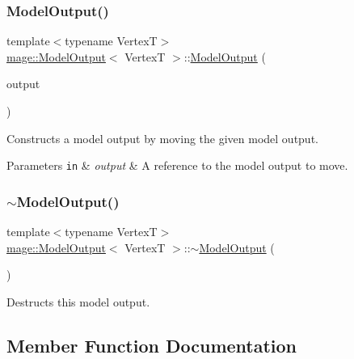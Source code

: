 \subsubsection{\texorpdfstring{Model\+Output()}{ModelOutput()}\hspace{0.1cm}{\footnotesize\ttfamily [3/3]}}
{\footnotesize\ttfamily template$<$typename VertexT$>$ \\
\hyperlink{structmage_1_1_model_output}{mage\+::\+Model\+Output}$<$ VertexT $>$\+::\hyperlink{structmage_1_1_model_output}{Model\+Output} (\begin{DoxyParamCaption}\item[{\hyperlink{structmage_1_1_model_output}{Model\+Output}$<$ VertexT $>$ \&\&}]{output }\end{DoxyParamCaption})\hspace{0.3cm}{\ttfamily [default]}}

Constructs a model output by moving the given model output.


\begin{DoxyParams}[1]{Parameters}
\mbox{\tt in}  & {\em output} & A reference to the model output to move. \\
\hline
\end{DoxyParams}
\hypertarget{structmage_1_1_model_output_a69a7f27486ad287943cbf973107ad8e1}{}\label{structmage_1_1_model_output_a69a7f27486ad287943cbf973107ad8e1} 
\subsubsection{\texorpdfstring{$\sim$\+Model\+Output()}{~ModelOutput()}}
{\footnotesize\ttfamily template$<$typename VertexT$>$ \\
\hyperlink{structmage_1_1_model_output}{mage\+::\+Model\+Output}$<$ VertexT $>$\+::$\sim$\hyperlink{structmage_1_1_model_output}{Model\+Output} (\begin{DoxyParamCaption}{ }\end{DoxyParamCaption})\hspace{0.3cm}{\ttfamily [default]}}

Destructs this model output. 

\subsection{Member Function Documentation}
\hypertarget{structmage_1_1_model_output_ad62942de2a55fce53d31aeafa1d0795a}{}\label{structmage_1_1_model_output_ad62942de2a55fce53d31aeafa1d0795a} 

